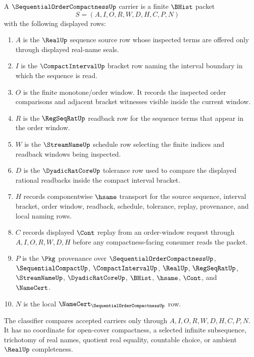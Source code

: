 \begin{definition}
\label{def:sequential-order-compactness-carrier}
A $\SequentialOrderCompactnessUp$ carrier is a finite $\BHist$ packet
$$
S=(A,I,O,R,W,D,H,C,P,N)
$$
with the following displayed rows:
\begin{enumerate}
\item $A$ is the $\RealUp$ sequence source row whose inspected terms are offered only through displayed real-name seals.
\item $I$ is the $\CompactIntervalUp$ bracket row naming the interval boundary in which the sequence is read.
\item $O$ is the finite monotone/order window. It records the inspected order comparisons and adjacent bracket witnesses visible inside the current window.
\item $R$ is the $\RegSeqRatUp$ readback row for the sequence terms that appear in the order window.
\item $W$ is the $\StreamNameUp$ schedule row selecting the finite indices and readback windows being inspected.
\item $D$ is the $\DyadicRatCoreUp$ tolerance row used to compare the displayed rational readbacks inside the compact interval bracket.
\item $H$ records componentwise $\hsame$ transport for the source sequence, interval bracket, order window, readback, schedule, tolerance, replay, provenance, and local naming rows.
\item $C$ records displayed $\Cont$ replay from an order-window request through $A,I,O,R,W,D,H$ before any compactness-facing consumer reads the packet.
\item $P$ is the $\Pkg$ provenance over $\SequentialOrderCompactnessUp$, $\SequentialCompactUp$, $\CompactIntervalUp$, $\RealUp$, $\RegSeqRatUp$, $\StreamNameUp$, $\DyadicRatCoreUp$, $\BHist$, $\hsame$, $\Cont$, and $\NameCert$.
\item $N$ is the local $\NameCert_{\SequentialOrderCompactnessUp}$ row.
\end{enumerate}
The classifier compares accepted carriers only through $A,I,O,R,W,D,H,C,P,N$. It has no coordinate for open-cover compactness, a selected infinite subsequence, trichotomy of real names, quotient real equality, countable choice, or ambient $\RealUp$ completeness.
\end{definition}


